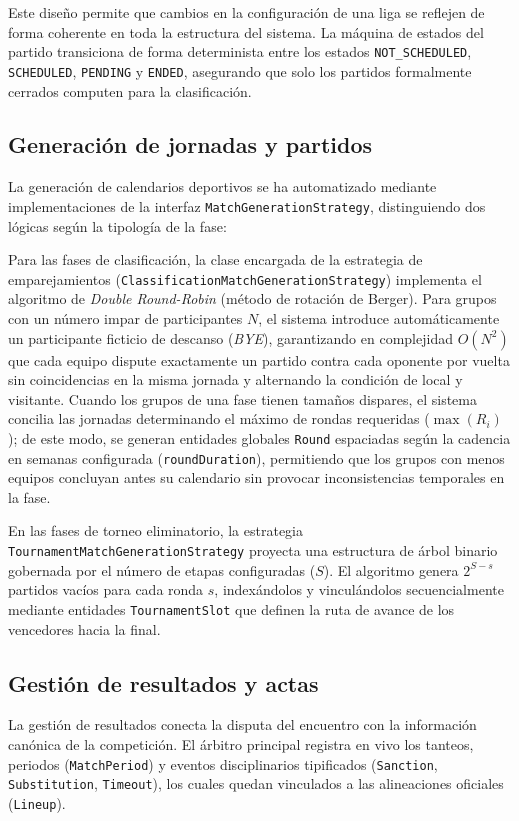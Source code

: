 Este diseño permite que cambios en la configuración de una liga se reflejen de forma coherente en toda la estructura del sistema. La máquina de estados del partido transiciona de forma determinista entre los estados \texttt{NOT\_SCHEDULED}, \texttt{SCHEDULED}, \texttt{PENDING} y \texttt{ENDED}, asegurando que solo los partidos formalmente cerrados computen para la clasificación.

\subsection{Generación de jornadas y partidos}
La generación de calendarios deportivos se ha automatizado mediante implementaciones de la interfaz \texttt{MatchGenerationStrategy}, distinguiendo dos lógicas según la tipología de la fase:

Para las fases de clasificación, la clase encargada de la estrategia de emparejamientos (\texttt{Classification\-Match\-Generation\-Strategy}) implementa el algoritmo de \emph{Double Round-Robin} (método de rotación de Berger). Para grupos con un número impar de participantes $N$, el sistema introduce automáticamente un participante ficticio de descanso (\emph{BYE}), garantizando en complejidad $O(N^2)$ que cada equipo dispute exactamente un partido contra cada oponente por vuelta sin coincidencias en la misma jornada y alternando la condición de local y visitante. Cuando los grupos de una fase tienen tamaños dispares, el sistema concilia las jornadas determinando el máximo de rondas requeridas ($\max(R_i)$); de este modo, se generan entidades globales \texttt{Round} espaciadas según la cadencia en semanas configurada (\texttt{roundDuration}), permitiendo que los grupos con menos equipos concluyan antes su calendario sin provocar inconsistencias temporales en la fase.

En las fases de torneo eliminatorio, la estrategia \texttt{Tournament\-Match\-Generation\-Strategy} proyecta una estructura de árbol binario gobernada por el número de etapas configuradas ($S$). El algoritmo genera $2^{S - s}$ partidos vacíos para cada ronda $s$, indexándolos y vinculándolos secuencialmente mediante entidades \texttt{TournamentSlot} que definen la ruta de avance de los vencedores hacia la final.

\subsection{Gestión de resultados y actas}
La gestión de resultados conecta la disputa del encuentro con la información canónica de la competición. El árbitro principal registra en vivo los tanteos, periodos (\texttt{MatchPeriod}) y eventos disciplinarios tipificados (\texttt{Sanction}, \texttt{Substitution}, \texttt{Timeout}), los cuales quedan vinculados a las alineaciones oficiales (\texttt{Lineup}). 

